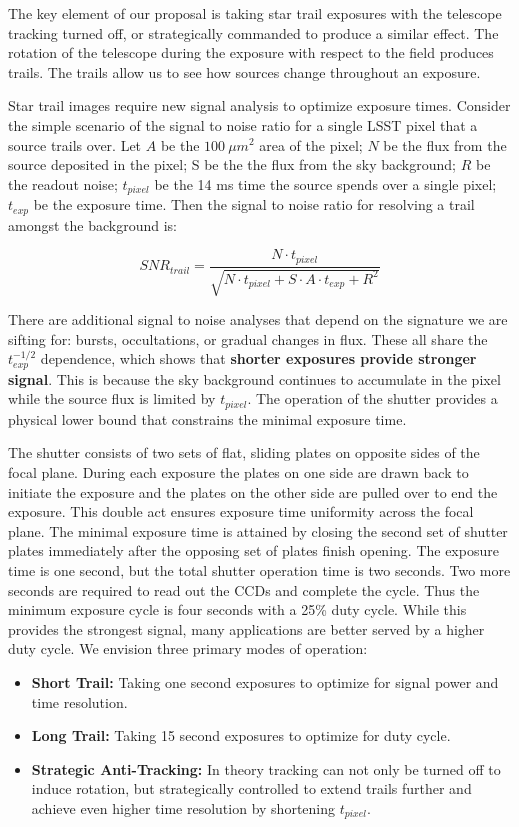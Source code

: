 \documentclass[12pt, letterpaper]{article}
\begin{document}
The key element of our proposal is taking star trail exposures with the telescope tracking turned off, or strategically commanded to produce a similar effect. The rotation of the telescope during the exposure with respect to the field produces trails. The trails allow us to see how sources change throughout an exposure. 

Star trail images require new signal analysis to optimize exposure times. Consider the simple scenario of the signal to noise ratio for a single LSST pixel that a source trails over. Let $A$ be the $100\ \mu m^2$ area of the pixel; $N$ be the flux from the source deposited in the pixel; S be the the flux from the sky background; $R$ be the readout noise; $t_{pixel}$ be the 14 ms time the source spends over a single pixel; $t_{exp}$ be the exposure time. Then the signal to noise ratio for resolving a trail amongst the background is:

$$SNR_{trail} = \frac{N\cdot t_{pixel}}{\sqrt{N\cdot t_{pixel} + S \cdot A \cdot t_{exp} + R^2}}$$

\noindent There are additional signal to noise analyses that depend on the signature we are sifting for: bursts, occultations, or gradual changes in flux. These all share the $t_{exp}^{-1/2}$ dependence, which shows that \textbf{shorter exposures provide stronger signal}. This is because the sky background continues to accumulate in the pixel while the source flux is limited by $t_{pixel}$. The operation of the shutter provides a physical lower bound that constrains the minimal exposure time.

The shutter consists of two sets of flat, sliding plates on opposite sides of the focal plane. During each exposure the plates on one side are drawn back to initiate the exposure and the plates on the other side are pulled over to end the exposure. This double act ensures exposure time uniformity across the focal plane. The minimal exposure time is attained by closing the second set of shutter plates immediately after the opposing set of plates finish opening. The exposure time is one second, but the total shutter operation time is two seconds. Two more seconds are required to read out the CCDs and complete the cycle. Thus the minimum exposure cycle is four seconds with a 25\% duty cycle. While this provides the strongest signal, many applications are better served by a higher duty cycle. We envision three primary modes of operation:

\begin{itemize}
\item \textbf{Short Trail:} Taking one second exposures to optimize for signal power and time resolution.

\item \textbf{Long Trail:} Taking 15 second exposures to optimize for duty cycle.

\item \textbf{Strategic Anti-Tracking:} In theory tracking can not only be turned off to induce rotation, but strategically controlled to extend trails further and achieve even higher time resolution by shortening $t_{pixel}$. 
\end{itemize}
\end{document}

